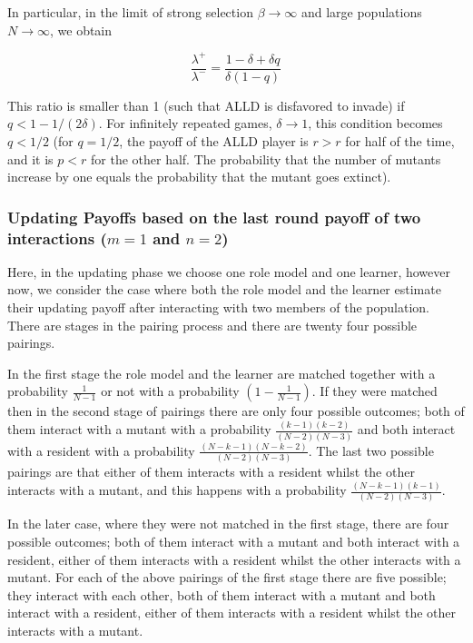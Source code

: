 \documentclass[11pt]{article}
\theoremstyle{plainCl1}
\theoremstyle{plainCl2}
\begin{document}
In particular, in the limit of strong selection \(\beta \rightarrow \infty\) and
large populations \(N \rightarrow \infty \), we obtain

\begin{equation*}
    \frac{\lambda^{+}}{\lambda^{-}} = \frac{1 - \delta + \delta q}{\delta(1 - q)}
\end{equation*}

This ratio is smaller than 1 (such that ALLD is disfavored to invade) if \(q <
1- 1/(2 \delta)\). For infinitely repeated games, \(\delta \rightarrow 1\), this
condition becomes \(q < 1/2\) (for \(q = 1/2\), the payoff of the ALLD player is
\(r > r\) for half of the time, and it is \(p < r\) for the other half. The
probability that the number of mutants increase by one equals the probability
that the mutant goes extinct).

\subsubsection{Updating Payoffs based on the last round payoff of two interactions (\(m=1\) and \(n=2\))}\label{section:m_one_n_two}

Here, in the updating phase we choose one role model and one learner, however
now, we consider the case where both the role model and the learner estimate
their updating payoff after interacting with two members of the population.
There are stages in the pairing process and there are twenty four possible
pairings.

In the first stage the role model and the learner are matched together with a
probability $\frac{1}{N-1}$ or not with a probability $(1 - \frac{1}{N-1})$. If
they were matched then in the second stage of pairings there are only four
possible outcomes; both of them interact with a mutant with a probability
$\frac{(k-1)(k-2)}{(N-2)(N-3)}$ and both interact with a resident with a
probability $\frac{(N-k-1)(N-k-2)}{(N-2)(N-3)}$. The last two possible pairings
are that either of them interacts with a resident whilst the other interacts
with a mutant, and this happens with a probability
$\frac{(N-k-1)(k-1)}{(N-2)(N-3)}$.

In the later case, where they were not matched in the first stage, there are
four possible outcomes; both of them interact with a mutant and both interact
with a resident, either of them interacts with a resident whilst the other
interacts with a mutant. For each of the above pairings of the first stage there
are five possible; they interact with each other, both of them interact with a
mutant and both interact with a resident, either of them interacts with a
resident whilst the other interacts with a mutant.
\end{document}
